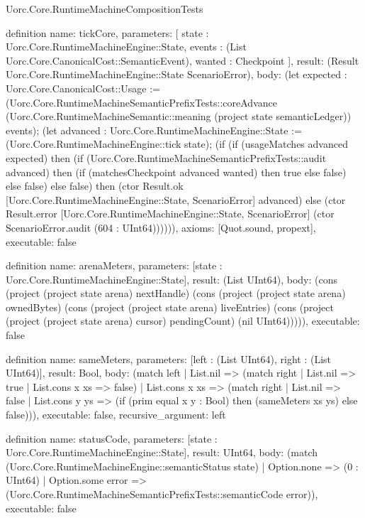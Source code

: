 \begin{lexlean}{Uorc.Core.RuntimeMachineCompositionTests}
\begin{semanticmodule}
definition{
  name: tickCore,
  parameters: [
    state : Uorc.Core.RuntimeMachineEngine::State,
    events : (List Uorc.Core.CanonicalCost::SemanticEvent),
    wanted : Checkpoint
  ],
  result: (Result Uorc.Core.RuntimeMachineEngine::State ScenarioError),
  body: (let expected : Uorc.Core.CanonicalCost::Usage := (Uorc.Core.RuntimeMachineSemanticPrefixTests::coreAdvance (Uorc.Core.RuntimeMachineSemantic::meaning (project state semanticLedger)) events); (let advanced : Uorc.Core.RuntimeMachineEngine::State := (Uorc.Core.RuntimeMachineEngine::tick state); (if (if (usageMatches advanced expected) then (if (Uorc.Core.RuntimeMachineSemanticPrefixTests::audit advanced) then (if (matchesCheckpoint advanced wanted) then true else false) else false) else false) then (ctor Result.ok [Uorc.Core.RuntimeMachineEngine::State, ScenarioError] advanced) else (ctor Result.error [Uorc.Core.RuntimeMachineEngine::State, ScenarioError] (ctor ScenarioError.audit (604 : UInt64)))))),
  axioms: [Quot.sound, propext],
  executable: false
}

definition{
  name: arenaMeters,
  parameters: [state : Uorc.Core.RuntimeMachineEngine::State],
  result: (List UInt64),
  body: (cons (project (project state arena) nextHandle) (cons (project (project state arena) ownedBytes) (cons (project (project state arena) liveEntries) (cons (project (project (project state arena) cursor) pendingCount) (nil UInt64))))),
  executable: false
}

definition{
  name: sameMeters,
  parameters: [left : (List UInt64), right : (List UInt64)],
  result: Bool,
  body: (match left
    | List.nil => (match right | List.nil => true | List.cons x xs => false)
    | List.cons x xs => (match right
      | List.nil => false
      | List.cons y ys => (if (prim equal x y : Bool) then (sameMeters xs ys) else false))),
  executable: false,
  recursive_argument: left
}

definition{
  name: statusCode,
  parameters: [state : Uorc.Core.RuntimeMachineEngine::State],
  result: UInt64,
  body: (match (Uorc.Core.RuntimeMachineEngine::semanticStatus state)
    | Option.none => (0 : UInt64)
    | Option.some error => (Uorc.Core.RuntimeMachineSemanticPrefixTests::semanticCode error)),
  executable: false
}


\end{semanticmodule}
\end{lexlean}
